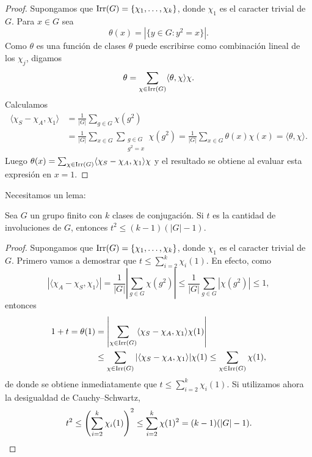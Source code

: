 \begin{proof}
Supongamos que $\operatorname{Irr}(G)=\{\chi_1,\dots,\chi_k\}$, donde $\chi_1$ es el caracter trivial de $G$. 
Para $x\in G$ sea 
\[
\theta(x)=|\{y\in G:y^2=x\}|.
\]
Como $\theta$ es una función de clases
$\theta$ puede escribirse como combinación lineal de los $\chi_j$, digamos
\[
\theta=\sum_{\chi\in\operatorname{Irr}(G)}\langle\theta,\chi\rangle\chi.
\]
Calculamos
\begin{align*}
    \langle\chi_S-\chi_A,\chi_1\rangle 
    &=\frac{1}{|G|}\sum_{g\in G}\chi(g^2)\\
    &=\frac{1}{|G|}\sum_{x\in G}\sum_{\substack{g\in G\\g^2=x}}\chi(g^2)
    =\frac{1}{|G|}\sum_{x\in G}\theta(x)\chi(x)=\langle\theta,\chi\rangle.
\end{align*}
Luego $\theta(x)=\sum_{\chi\in\operatorname{Irr}(G)}\langle\chi_S-\chi_A,\chi_1\rangle\chi$ y el resultado se obtiene
al evaluar esta expresión en $x=1$. 
\end{proof}

Necesitamos un lema:

\begin{lemma}
Sea $G$ un grupo finito con $k$ clases de conjugación. 
Si $t$ es la cantidad de involuciones de $G$, entonces 
$t^2\leq (k-1)(|G|-1)$. 
\end{lemma}

\begin{proof}
Supongamos que $\operatorname{Irr}(G)=\{\chi_1,\dots,\chi_k\}$, donde $\chi_1$ es el 
caracter trivial de $G$. Primero vamos a demostrar que 
$t\leq\sum_{i=2}^k\chi_i(1)$. En efecto, 
como 
\[
|\langle\chi_A-\chi_S,\chi_1\rangle|
=\frac{1}{|G|}\left|\sum_{g\in G}\chi(g^2)\right|
\leq\frac{1}{|G|}\sum_{g\in G}|\chi(g^2)|\leq 1,
\]
entonces 
\begin{align*}
1+t=\theta(1)
&=\left|\sum_{\chi\in\operatorname{Irr}(G)}\langle\chi_S-\chi_A,\chi_1\rangle\chi(1)\right|\\
&\leq\sum_{\chi\in\operatorname{Irr}(G)}|\langle\chi_S-\chi_A,\chi_1\rangle|\chi(1)
\leq\sum_{\chi\in\operatorname{Irr}(G)}\chi(1),
\end{align*}
de donde se obtiene inmediatamente que $t\leq\sum_{i=2}^k\chi_i(1)$. 
Si utilizamos ahora 
la desigualdad de Cauchy--Schwartz, 
\[
t^2\leq\left(\sum_{i=2}^k\chi_i(1)\right)^2
\leq\sum_{i=2}^k\chi(1)^2=(k-1)(|G|-1).\qedhere
\]
\end{proof}

